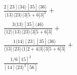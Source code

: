 \documentclass[varwidth, border=5pt]{standalone}
\begin{document}
\begin{my}
$\begin{gathered}
\scriptscriptstyle\frac{2[23]⟨34⟩[35]⟨36⟩}{⟨13⟩⟨23⟩⟨3|5+6|3]^2}+\\
\scriptscriptstyle\frac{3⟨13⟩[35]⟨46⟩}{⟨12⟩⟨13⟩⟨23⟩⟨3|5+6|3]}+\\
\scriptscriptstyle\frac{1⟨14⟩[23][35]⟨36⟩}{⟨13⟩⟨23⟩⟨1|2+4|3]⟨3|5+6|3]}+\\
\scriptscriptstyle\frac{1/6[15]^2}{[14]⟨23⟩^2[56]}\phantom{+}
\end{gathered}$
\end{my}
\end{document}
